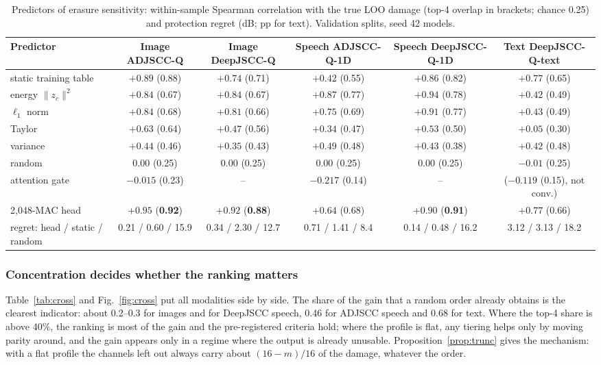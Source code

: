 \documentclass[journal]{IEEEtran}
\begin{document}
\begin{table}[t]\centering
\caption{Predictors of erasure sensitivity: within-sample Spearman correlation with the true LOO damage
(top-4 overlap in brackets; chance 0.25) and protection regret (dB; pp for text). Validation splits, seed 42 models.}
\label{tab:proxies}
\begin{tabular}{lccccc}\toprule
Predictor & Image ADJSCC-Q & Image DeepJSCC-Q & Speech ADJSCC-Q-1D & Speech DeepJSCC-Q-1D & Text DeepJSCC-Q-text\\\midrule
static training table & $+0.89$ (0.88) & $+0.74$ (0.71) & $+0.42$ (0.55) & $+0.86$ (0.82) & $\mathbf{+0.77}$ (0.65)\\
energy $\|z_c\|^2$ & $+0.84$ (0.67) & $+0.84$ (0.67) & $\mathbf{+0.87}$ (0.77) & $\mathbf{+0.94}$ (0.78) & $+0.42$ (0.49)\\
$\ell_1$ norm & $+0.84$ (0.68) & $+0.81$ (0.66) & $+0.75$ (0.69) & $+0.91$ (0.77) & $+0.43$ (0.49)\\
Taylor & $+0.63$ (0.64) & $+0.47$ (0.56) & $+0.34$ (0.47) & $+0.53$ (0.50) & $+0.05$ (0.30)\\
variance & $+0.44$ (0.46) & $+0.35$ (0.43) & $+0.49$ (0.48) & $+0.43$ (0.38) & $+0.42$ (0.48)\\
random & $0.00$ (0.25) & $0.00$ (0.25) & $0.00$ (0.25) & $0.00$ (0.25) & $-0.01$ (0.25)\\
attention gate & $-0.015$ (0.23) & -- & $-0.217$ (0.14) & -- & ($-0.119$ (0.15), not conv.)\\
2,048-MAC head & $\mathbf{+0.95}$ (\textbf{0.92}) & $\mathbf{+0.92}$ (\textbf{0.88}) & $+0.64$ (0.68) & $+0.90$ (\textbf{0.91}) & $+0.77$ (0.66)\\\midrule
regret: head / static / random & 0.21 / 0.60 / 15.9 & 0.34 / 2.30 / 12.7 & 0.71 / 1.41 / 8.4 & 0.14 / 0.48 / 16.2 & 3.12 / 3.13 / 18.2\\
\bottomrule\end{tabular}
\end{table}

\subsubsection{Concentration decides whether the ranking matters}
Table~\ref{tab:cross} and Fig.~\ref{fig:cross} put all modalities side by side. The share of the gain that
a random order already obtains is the clearest indicator: about 0.2--0.3 for images and for DeepJSCC
speech, 0.46 for ADJSCC speech and 0.68 for text. Where the top-4 share is above 40\%, the ranking is
most of the gain and the pre-registered criteria hold; where the profile is flat, any tiering helps only
by moving parity around, and the gain appears only in a regime where the output is already unusable.
Proposition~\ref{prop:trunc} gives the mechanism: with a flat profile the channels left out always carry
about $(16-m)/16$ of the damage, whatever the order.
\end{document}
